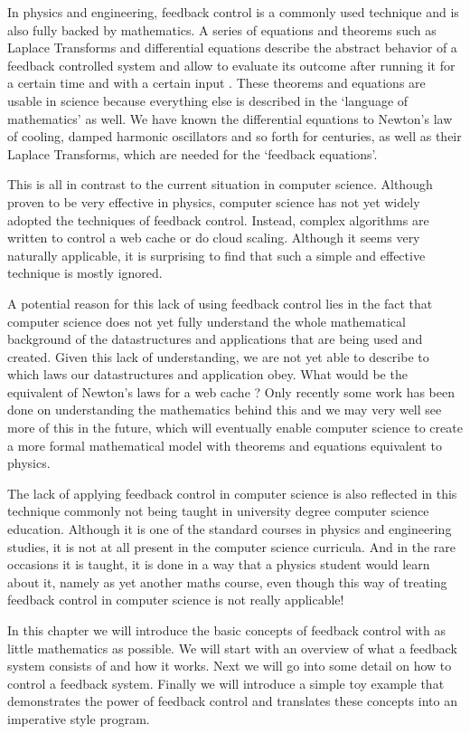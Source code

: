 In physics and engineering, feedback control is a commonly used technique and is also fully backed by mathematics. A series of equations and theorems such as Laplace Transforms and differential equations describe the abstract behavior of a feedback controlled system and allow to evaluate its outcome after running it for a certain time and with a certain input \cite{hellerstein2004-feedback, janert2013-feedback}. These theorems and equations are usable in science because everything else is described in the `language of mathematics' as well. We have known the differential equations to Newton's law of cooling, damped harmonic oscillators and so forth for centuries, as well as their Laplace Transforms, which are needed for the `feedback equations'.

This is all in contrast to the current situation in computer science. Although proven to be very effective in physics, computer science has not yet widely adopted the techniques of feedback control. Instead, complex algorithms are written to control a web cache or do cloud scaling. Although it seems very naturally applicable, it is surprising to find that such a simple and effective technique is mostly ignored.

A potential reason for this lack of using feedback control lies in the fact that computer science does not yet fully understand the whole mathematical background of the datastructures and applications that are being used and created. Given this lack of understanding, we are not yet able to describe to which laws our datastructures and application obey. What would be the equivalent of Newton's laws for a web cache \cite{janert2013-feedback}? Only recently some work has been done on understanding the mathematics behind this \cite{beckmann2015-cache-calculus} and we may very well see more of this in the future, which will eventually enable computer science to create a more formal mathematical model with theorems and equations equivalent to physics.

The lack of applying feedback control in computer science is also reflected in this technique commonly not being taught in university degree computer science education. Although it is one of the standard courses in physics and engineering studies, it is not at all present in the computer science curricula. And in the rare occasions it is taught, it is done in a way that a physics student would learn about it, namely as yet another maths course, even though this way of treating feedback control in computer science is not really applicable!

In this chapter we will introduce the basic concepts of feedback control with as little mathematics as possible. We will start with an overview of what a feedback system consists of and how it works. Next we will go into some detail on how to control a feedback system. Finally we will introduce a simple toy example that demonstrates the power of feedback control and translates these concepts into an imperative style program.






